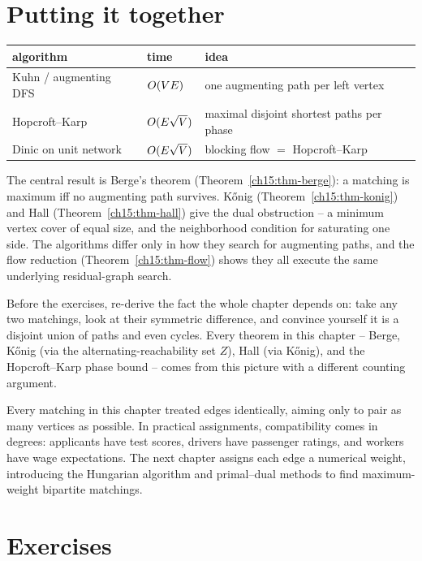 \section{Putting it together}
\label{ch15:summary}

\begin{center}
\begin{tabular}{@{}lll@{}}
\toprule
algorithm & time & idea \\
\midrule
Kuhn / augmenting DFS & $O(VE)$ & one augmenting path per left vertex \\
Hopcroft--Karp & $O(E\sqrt{V})$ & maximal disjoint shortest paths per phase \\
Dinic on unit network & $O(E\sqrt{V})$ & blocking flow $=$ Hopcroft--Karp \\
\bottomrule
\end{tabular}
\end{center}

The central result is Berge's theorem
(Theorem~\ref{ch15:thm-berge}): a matching is maximum iff no augmenting path
survives. K\H{o}nig (Theorem~\ref{ch15:thm-konig}) and Hall
(Theorem~\ref{ch15:thm-hall}) give the dual obstruction -- a minimum vertex cover
of equal size, and the neighborhood condition for saturating one side. The
algorithms differ only in how they search for augmenting paths, and the flow
reduction (Theorem~\ref{ch15:thm-flow}) shows they all execute the same underlying
residual-graph search.

\begin{recoverybox}
Before the exercises, re-derive the fact the whole chapter depends on: take any two
matchings, look at their symmetric difference, and convince yourself it is a
disjoint union of paths and even cycles. Every theorem in this chapter -- Berge,
K\H{o}nig (via the alternating-reachability set $Z$), Hall (via K\H{o}nig), and
the Hopcroft--Karp phase bound -- comes from this picture with a different counting
argument.
\end{recoverybox}

Every matching in this chapter treated edges identically, aiming only to pair as many vertices as possible.
In practical assignments, compatibility comes in degrees: applicants have test scores, drivers have passenger ratings, and workers have wage expectations.
The next chapter assigns each edge a numerical weight, introducing the Hungarian algorithm and primal--dual methods to find maximum-weight bipartite matchings.

\section{Exercises}
\label{ch15:exercises}

